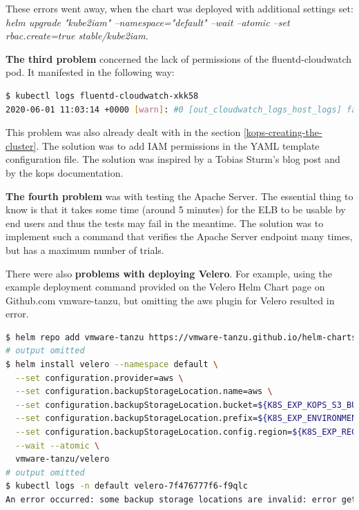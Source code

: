 These errors went away, when the chart was deployed with additional settings set: \textit{helm upgrade "kube2iam" --namespace="default" --wait --atomic --set rbac.create=true stable/kube2iam}.

\textbf{The third problem} concerned the lack of permissions of the fluentd-cloudwatch pod. It manifested in the following way:
\begin{lstlisting}[basicstyle=\tiny,caption={TODO},captionpos=b,language=Bash,xleftmargin=1cm]
$ kubectl logs fluentd-cloudwatch-xkk58
2020-06-01 11:03:14 +0000 [warn]: #0 [out_cloudwatch_logs_host_logs] failed to flush the buffer. retry_time=8 next_retry_seconds=2020-06-01 11:05:22 +0000 chunk="5a703b5e45c9592f24399f9b73acaf43" error_class=Aws::CloudWatchLogs::Errors::AccessDeniedException error="User: arn:aws:sts::976184668068:assumed-role/nodes.testing.k8s-kops-for-masters-thesis.k8s.local/i-04a926040234f36d6 is not authorized to perform: logs:DescribeLogGroups on resource: arn:aws:logs:eu-west-1:976184668068:log-group::log-stream:"
\end{lstlisting}
This problem was also already dealt with in the section \ref{kops-creating-the-cluster}. The solution was to add IAM permissions in the YAML template configuration file. The solution was inspired by a Tobias Sturm's blog post\cite{kops-logs-cw-tobias} and by the kops documentation\cite{online-kops-iam}.

\textbf{The fourth problem} was with testing the Apache Server. The essential thing to know is that it takes some time (around 5 minutes) for the ELB to be usable by end users and thus the tests may fail in the meantime. The solution was to implement such a command that verifies the Apache Server endpoint many times, but has a maximum number of trials.

There were also \textbf{problems with deploying Velero}. For example, using the example deployment command provided on the Velero Helm Chart page on Github.com vmware-tanzu\cite{velero-helm-chart}, but omitting the aws plugin for Velero resulted in error.

\begin{lstlisting}[basicstyle=\tiny,caption={TODO},captionpos=b,language=Bash,xleftmargin=1cm]
$ helm repo add vmware-tanzu https://vmware-tanzu.github.io/helm-charts
# output omitted
$ helm install velero --namespace default \
  --set configuration.provider=aws \
  --set configuration.backupStorageLocation.name=aws \
  --set configuration.backupStorageLocation.bucket=${K8S_EXP_KOPS_S3_BUCKET} \
  --set configuration.backupStorageLocation.prefix=${K8S_EXP_ENVIRONMENT} \
  --set configuration.backupStorageLocation.config.region=${K8S_EXP_REGION} \
  --wait --atomic \
  vmware-tanzu/velero
# output omitted
$ kubectl logs -n default velero-7f476777f6-f9qlc
An error occurred: some backup storage locations are invalid: error getting backup store for location "aws": unable to locate ObjectStore plugin named velero.io/aws
\end{lstlisting}

